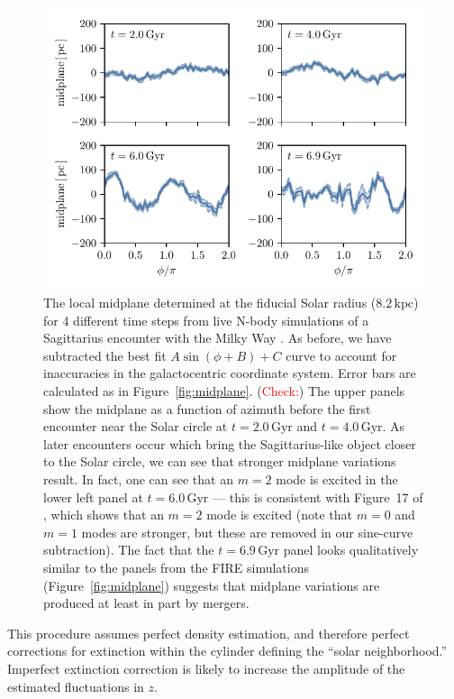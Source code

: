 \documentclass[twocolumn]{aastex62}
\newcommand{\Gus}[1]{\textcolor{red}{#1}}
\newcommand{\kpc}{\text{kpc}}
\newcommand{\Gyr}{\text{Gyr}}
\begin{document}
\begin{figure}[htb!]
\begin{center}
\includegraphics[width=342.078286667pt]{fig/midplane_fit_chervinsim.pdf}
\end{center}
\caption{The local midplane determined at the fiducial Solar radius
($8.2\,\kpc$) for 4 different time steps from live N-body simulations of a
Sagittarius encounter with the Milky Way \citep{2018MNRAS.481..286L}. As
before, we have subtracted the best fit $A\sin{(\phi+B)}+C$ curve to account
for inaccuracies in the galactocentric coordinate system. Error bars are
calculated as in Figure~\ref{fig:midplane}. (\Gus{Check:}) The upper panels
show the midplane as a function of azimuth before the first encounter near the
Solar circle at $t=2.0\,\Gyr$ and $t=4.0\,\Gyr$. As later encounters occur
which bring the Sagittarius-like object closer to the Solar circle, we can see
that stronger midplane variations result. In fact, one can see that an $m=2$
mode is excited in the lower left panel at $t=6.0\,\Gyr$ --- this is
consistent with Figure~17 of \citet{2018MNRAS.481..286L}, which shows that an
$m=2$ mode is excited (note that $m=0$ and $m=1$ modes are stronger, but these
are removed in our sine-curve subtraction). The fact that the $t=6.9\,\Gyr$
panel looks qualitatively similar to the panels from the FIRE simulations
(Figure~\ref{fig:midplane}) suggests that midplane variations are
produced at least in part by mergers.}
\label{fig:midplane_chervin}
\end{figure}

This procedure assumes perfect density estimation, and therefore perfect
corrections for extinction within the cylinder defining the ``solar
neighborhood.'' Imperfect extinction correction is likely to increase the
amplitude of the estimated fluctuations in $z$.
\end{document}
